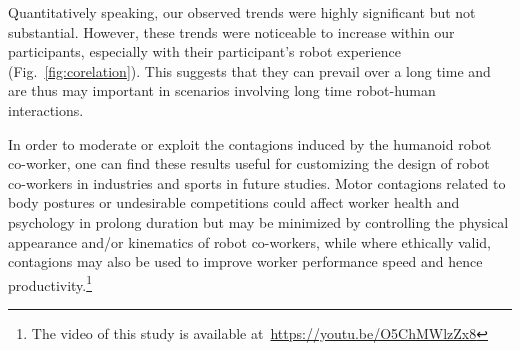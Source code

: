 Quantitatively speaking, our observed trends were highly significant but not substantial. However, these trends were noticeable to increase within our participants, especially with their participant's robot experience (Fig.~\ref{fig:corelation}). This suggests that they can prevail over a long time and are thus may important in scenarios involving long time robot-human interactions. 

In order to moderate or exploit the contagions induced by the humanoid robot co-worker, one can find these results useful for customizing the design of robot co-workers in industries and sports in future studies. Motor contagions related to body postures or undesirable competitions could affect worker health and psychology in prolong duration but may be minimized by controlling the physical appearance and/or kinematics of robot co-workers, while where ethically valid, contagions may also be used to improve worker performance speed and hence productivity.\footnote{The video of this study is available at~\url{https://youtu.be/O5ChMWlzZx8}}

\clearpage %






